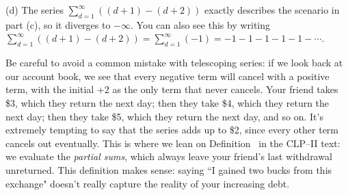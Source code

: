 \begin{solution}
(d) The series $\displaystyle\sum_{d=1}^\infty ((d+1)-(d+2))$ exactly describes the scenario in part (c), so it diverges to $-\infty$. You can also see this by writing
$\displaystyle\sum_{d=1}^\infty ((d+1)-(d+2)) =\sum_{d=1}^\infty (-1)=-1-1-1-1-1-\cdots$.

Be careful to avoid a common mistake with telescoping series: if we look back at our account book, we see that every negative term will cancel with a positive term, with the initial $+2$ as the only term that never cancels. Your friend takes \$3, which they return the next day; then they take \$4, which they return the next day; then they take \$5, which they return the next day, and so on. It's extremely tempting to say that the series adds up to \$2, since every other term cancels out eventually. This is where we lean on Definition~ in the CLP--II text:
we evaluate the \emph{partial sums}, which always leave your friend's last withdrawal unreturned. This definition makes sense: saying ``I gained two bucks from this exchange" doesn't really capture the reality of your increasing debt.
\end{solution}

